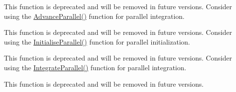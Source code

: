 
\begin{DoxyRefList}
\item[Member \mbox{\hyperlink{classLidDrivenCavity_a0456e69240df3932761fc3820fde0bed}{Lid\+Driven\+Cavity\+::Advance}} (bool verbose\+\_\+advance)]\label{deprecated__deprecated000004}%
%
This function is deprecated and will be removed in future versions. Consider using the \mbox{\hyperlink{classLidDrivenCavity_ad6f85225e7526cd7f9f3c3fc48d8d3b0}{Advance\+Parallel()}} function for parallel integration. 
\item[Member \mbox{\hyperlink{classLidDrivenCavity_ab0eb448219134e835173e94874a3983a}{Lid\+Driven\+Cavity\+::Initialise}} ()]\label{deprecated__deprecated000002}%
%
This function is deprecated and will be removed in future versions. Consider using the \mbox{\hyperlink{classLidDrivenCavity_abd03496713e6fd52c2a88d94a8da6050}{Initialise\+Parallel()}} function for parallel initialization. 
\item[Member \mbox{\hyperlink{classLidDrivenCavity_a80cd7032d10f09279d62d03335023e72}{Lid\+Driven\+Cavity\+::Integrate}} ()]\label{deprecated__deprecated000003}%
%
This function is deprecated and will be removed in future versions. Consider using the \mbox{\hyperlink{classLidDrivenCavity_ac458ad4869ad3da2bb74e5500519298a}{Integrate\+Parallel()}} function for parallel integration. 
\item[Member \mbox{\hyperlink{classLidDrivenCavity_ae9194a027b9adec8c5f8a7031ca8266a}{Lid\+Driven\+Cavity\+::Scatter\+Domain}} (double $\ast$\+A\+\_\+local, double $\ast$\+A\+\_\+global)]\label{deprecated__deprecated000001}%
%
This function is deprecated and will be removed in future versions.
\end{DoxyRefList}